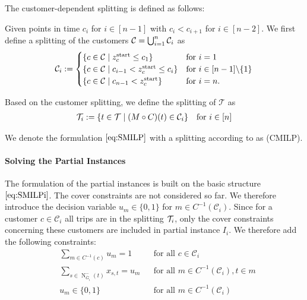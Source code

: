 The customer-dependent splitting is defined as follows:

\begin{definition}
\label{def:customer_dependent_splitting}

Given points in time $c_i$ for $i\in[n-1]$ with $c_i<c_{i+1}$ for $i\in[n-2]$. We first define a splitting of the customers $\mathcal{C}=\bigcup_{i=1}^n\mathcal{C}_i$ as
\begin{align*}
	\mathcal{C}_i := \begin{cases}
		\left\{c\in\mathcal{C}\mid z^{\operatorname{start}}_c\leq c_1\right\} & \text{for } i=1 \\
		\left\{c\in\mathcal{C}\mid c_{i-1}<z^{\operatorname{start}}_c\leq c_i\right\} & \text{for } i\in[n-1]\backslash\{1\} \\
		\left\{c\in\mathcal{C}\mid c_{n-1}<z^{\operatorname{start}}_c\right\} & \text{for } i=n.
	\end{cases}
\end{align*}

Based on the customer splitting, we define the splitting of $\mathcal{T}$ as
\begin{align*}
	\mathcal{T}_i := \left\{t\in\mathcal{T}\mid (M\circ C)(t)\in\mathcal{C}_i\right\} && \text{for } i\in[n]
\end{align*}

\end{definition}

We denote the formulation $\eqref{eq:SMILP}$ with a splitting according to  as (CMILP).

\paragraph{Solving the Partial Instances} \parfill

The formulation of the partial instances is built on the basic structure $\eqref{eq:SMILPi}$. The cover constraints are not considered so far. We therefore introduce the decision variable $u_m\in\{0,1\}$ for $m\in C^{-1}\left(\mathcal{C}_i\right)$. Since for a customer $c\in\mathcal{C}_i$ all trips are in the splitting $\mathcal{T}_i$, only the cover constraints concerning these customers are included in partial instance $I_i$. We therefore add the following constraints:
\begin{align}
	& \sum_{m\in C^{-1}(c)} u_m = 1 && \text{for all } c\in\mathcal{C}_i \label{eq:CMILP:customer} \\
	& \sum_{s\in\operatorname{N}_{\overline{G}_i}^-(t)} x_{s,t} = u_m && \text{for all } m\in C^{-1}\left(\mathcal{C}_i\right), t\in m \label{eq:CMILP:route} \\
	& u_m\in\{0,1\} && \text{for all } m\in C^{-1}\left(\mathcal{C}_i\right) \label{eq:CMILP:um}
\end{align}

